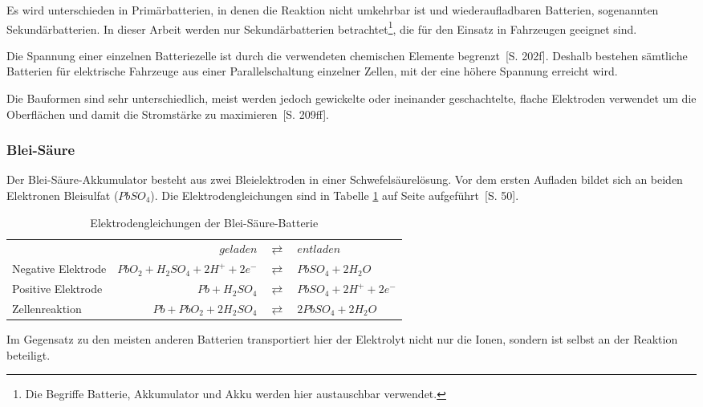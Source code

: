 Es wird unterschieden in Primärbatterien, in denen die Reaktion nicht umkehrbar ist und wiederaufladbaren Batterien, sogenannten Sekundärbatterien. In dieser Arbeit werden nur Sekundärbatterien betrachtet\footnote{Die Begriffe Batterie, Akkumulator und Akku werden hier austauschbar verwendet.}, die für den Einsatz in Fahrzeugen geeignet sind.

Die Spannung einer einzelnen Batteriezelle ist durch die verwendeten chemischen Elemente begrenzt~\cite{Sterner:2014}[S. 202f]. Deshalb bestehen sämtliche Batterien für elektrische Fahrzeuge aus einer Parallelschaltung einzelner Zellen, mit der eine höhere Spannung erreicht wird.

Die Bauformen sind sehr unterschiedlich, meist werden jedoch gewickelte oder ineinander geschachtelte, flache Elektroden verwendet um die Oberflächen und damit die Stromstärke zu maximieren~\cite{Sterner:2014}[S. 209ff].

\subsubsection{Blei-Säure}
Der Blei-Säure-Akkumulator besteht aus zwei Bleielektroden in einer Schwefelsäurelösung. Vor dem ersten Aufladen bildet sich an beiden Elektronen Bleisulfat ($PbSO_4$). Die Elektrodengleichungen sind in Tabelle \ref{Pb} auf Seite \pageref{Pb} aufgeführt~\cite{KiehneBattery}[S. 50].

\begin{table}\centering
	\begin{tabularx}{\linewidth}{XrcX}
		\toprule
		&                       $geladen$ & $\rightleftarrows$ & $entladen$             \\
		Negative Elektrode & $PbO_2 + H_2SO_4 + 2H^+ + 2e^-$ & $\rightleftarrows$ & $PbSO_4 + 2H_2O$       \\
		Positive Elektrode &                  $Pb + H_2SO_4$ & $\rightleftarrows$ & $PbSO_4 + 2H^+ + 2e^-$ \\ \midrule
		Zellenreaktion     &         $Pb + PbO_2 + 2H_2SO_4$ & $\rightleftarrows$ & $2PbSO_4 + 2H_2O$      \\ \bottomrule
	\end{tabularx}
	\caption{Elektrodengleichungen der Blei-Säure-Batterie}
	\label{Pb}
\end{table}

Im Gegensatz zu den meisten anderen Batterien transportiert hier der Elektrolyt nicht nur die Ionen, sondern ist selbst an der Reaktion beteiligt.

